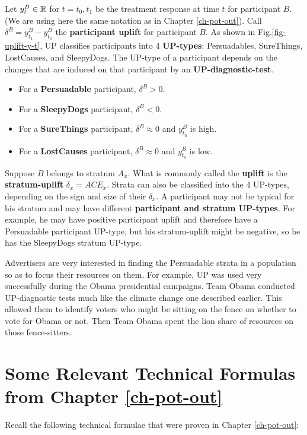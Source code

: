 Let $y^B_t\in { \mathbb{R}}$ for $t=t_0, t_1$
be the treatment response at time $t$
for participant $B$. (We are using here
the same notation as in Chapter \ref{ch-pot-out}).
Call $\delta^B=
y^B_{t_1}-y^B_{t_0}$ the {\bf participant uplift}
for participant $B$.
As shown
in Fig.\ref{fig-uplift-y-t},
UP classifies participants
into 4 {\bf UP-types}: Persuadables, SureThings, LostCauses,
and SleepyDogs.
The UP-type
of a participant
depends on the changes 
that are induced on that participant
by an {\bf UP-diagnostic-test}.
\begin{itemize}
\item
For a {\bf Persuadable} participant,
$\delta^B>0$.
\item
For a {\bf SleepyDogs}
participant, $\delta^B< 0$.
\item
For a {\bf SureThings} participant,
 $\delta^B\approx 0$
and $y^B_{t_0}$ is high.
\item
For a {\bf LostCauses} participant,
$\delta^B\approx 0$
and $y^B_{t_0}$ is low.
\end{itemize}


Suppose $B$
belongs to
stratum $A_x$.
What is commonly called 
the {\bf uplift} 
is the {\bf stratum-uplift}
 $\delta_x=ACE_x$.
Strata can also be
classified into
the 4 UP-types,
depending on the sign and size  
of their $\delta_x$.
A participant 
may not be typical for
his stratum
and may
have different
{\bf participant and stratum UP-types}.
For example, he may have positive 
participant uplift
and therefore have a Persuadable participant UP-type,
but his stratum-uplift
might be negative, so
he has
the SleepyDogs stratum UP-type.

Advertisers are very interested in finding
the Persuadable strata in a population
so as to focus their resources on them.
For example, UP was used very
successfully during the 
Obama presidential campaigns. 
Team Obama conducted UP-diagnostic
tests much like
the climate change one described earlier.
This allowed them to
identify voters who might be sitting on the fence
on whether to vote for Obama or not.
Then Team Obama spent
the lion share
of  resources  on those
fence-sitters.


\section{Some Relevant
 Technical Formulas from Chapter \ref{ch-pot-out}}
Recall
the following technical formulae
that were proven in 
Chapter \ref{ch-pot-out}:


